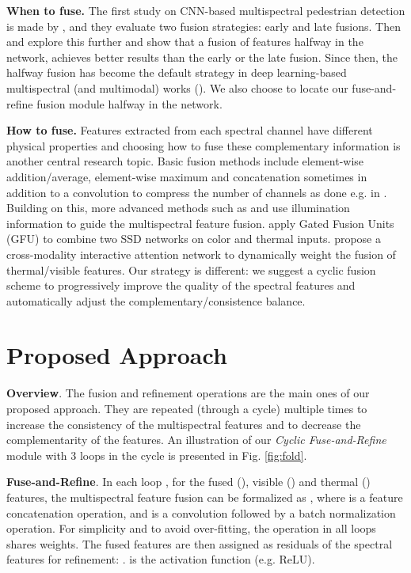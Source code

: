 \documentclass{article}
\begin{document}
\noindent
\textbf{When to fuse.} The first study on CNN-based multispectral pedestrian detection is made by \cite{DFCNN}, and they evaluate two fusion strategies: early and late fusions. Then \cite{TestAnno} and \cite{Illumination-aware-li} explore this further and show that a fusion of features halfway in the network, achieves better results than the early or the late fusion. Since then, the halfway fusion has become the default strategy in deep learning-based multispectral (and multimodal) works (\cite{Illumination-aware-li,Illumination-aware-guan,MSDS,CIAN,AR-CNN}). We also choose to locate our fuse-and-refine fusion module halfway in the network.

\noindent
\textbf{How to fuse.} Features extracted from each spectral channel have different physical properties and choosing how to fuse these complementary information is another central research topic. Basic fusion methods include element-wise addition/average, element-wise maximum and concatenation sometimes in addition to a  convolution to compress the number of channels as done e.g. in \cite{NIN}. Building on this, more advanced methods such as \cite{Illumination-aware-li} and \cite{Illumination-aware-guan} use illumination information to guide the multispectral feature fusion. \cite{GFD-SSD} apply Gated Fusion Units (GFU) \cite{GFU} to combine two SSD networks \cite{SSD} on color and thermal inputs. \cite{CIAN} propose a cross-modality interactive attention network to dynamically weight the fusion of thermal/visible features. Our strategy is  different: we suggest a cyclic fusion scheme to progressively improve the quality of the spectral features and automatically adjust the complementary/consistence balance. \section{Proposed Approach}
\label{sec:approach}

\noindent
\textbf{Overview}. The fusion and refinement operations are the main ones of our proposed approach. They are repeated (through a cycle) multiple times to increase the consistency of the multispectral features and to decrease the complementarity of the features.
An illustration of our \textit{Cyclic Fuse-and-Refine} module with 3 loops in the cycle is presented in Fig. \ref{fig:fold}. 

\noindent
\textbf{Fuse-and-Refine}. In each loop , for the fused (), visible () and thermal () features, the multispectral feature fusion can be formalized as , where  is a feature concatenation operation, and  is a  convolution followed by a batch normalization operation.
For simplicity and to avoid over-fitting, the operation  in all loops shares weights.
The fused features are then assigned as residuals of the spectral features for refinement: .  is the activation function (e.g. ReLU).
\end{document}
